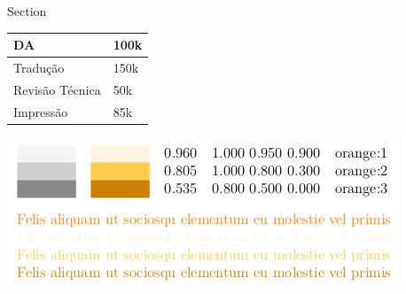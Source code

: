 \begin{frame}{Section}
\begin{longtable}[]{@{}ll@{}}
\toprule
DA & 100k\tabularnewline
\midrule
\endhead
Tradução & 150k\tabularnewline
Revisão Técnica & 50k\tabularnewline
Impressão & 85k\tabularnewline
\bottomrule
\end{longtable}

\includegraphics{Teste.png}
\end{frame}
